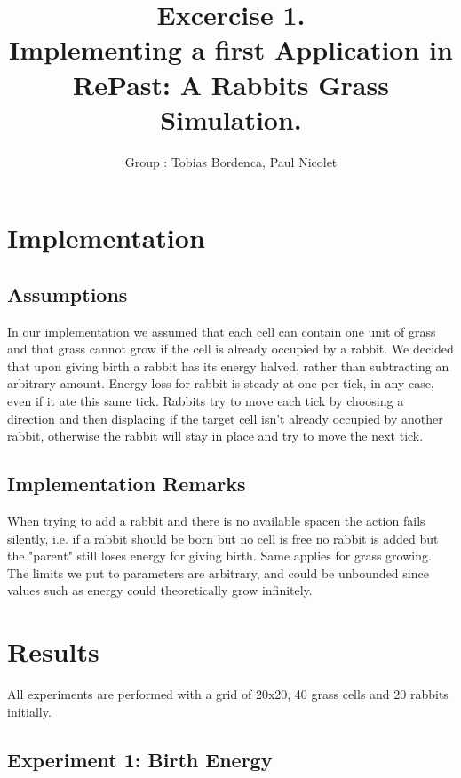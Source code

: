 \documentclass[11pt]{article}
\title{\bf Excercise 1.\\ Implementing a first Application in RePast: A Rabbits Grass Simulation.}
\author{Group \textnumero 1: Tobias Bordenca, Paul Nicolet}
\begin{document}
\maketitle

\section{Implementation}

\subsection{Assumptions}
In our implementation we assumed that each cell can contain one unit of grass and that grass cannot grow if the cell is already occupied by a rabbit. We decided that upon giving birth a rabbit has its energy halved, rather than subtracting an arbitrary amount. Energy loss for rabbit is steady at one per tick, in any case, even if it ate this same tick. Rabbits try to move each tick by choosing a direction and then displacing if the target cell isn't already occupied by another rabbit, otherwise the rabbit will stay in place and try to move the next tick.

\subsection{Implementation Remarks}
When trying to add a rabbit and there is no available spacen the action fails silently, i.e. if a rabbit should be born but no cell is free no rabbit is added but the "parent" still loses energy for giving birth. Same applies for grass growing. 
The limits we put to parameters are arbitrary, and could be unbounded since values such as energy could theoretically grow infinitely.

\section{Results}

All experiments are performed with a grid of 20x20, 40 grass cells and 20 rabbits initially.

\subsection{Experiment 1: Birth Energy}
\end{document}
